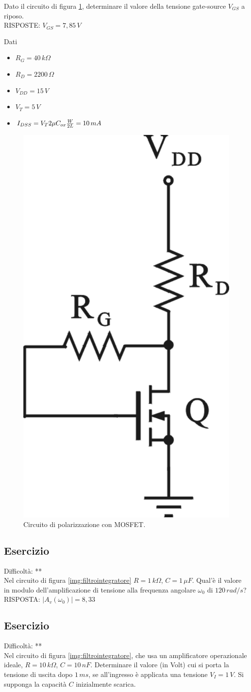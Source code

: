 \documentclass[a4paper,portrait,12pt]{article}
\theoremstyle{definition}
\begin{document}
Dato il circuito di figura \ref{img:MOS2}, determinare il valore della tensione gate-source 
$V_{GS}$ a riposo.\\

RISPOSTE: $V_{GS} = 7,85\,V$

Dati
\begin{itemize}
\item $R_G=40\,k\Omega$ 
\item $R_D=2200\,\Omega$
\item $V_{DD}=15\,V$ 
\item $V_T=5\,V$
\item $I_{DSS}=V_T2\mu C_{ox}{W\over 2L}=10\,mA$
\end{itemize}

\begin{figure}[H]
\centering
\includegraphics[width=.2\linewidth]{img/elettronicaEs/MOS2.pdf}
\caption{Circuito di polarizzazione con MOSFET.}
\label{img:MOS2}
\end{figure}


\subsection{Esercizio}

Difficoltà: **\\

Nel circuito di figura \ref{img:filtrointegratore} $R = 1\,k\Omega$, $C=1\,\mu F$. Qual'è il valore in modulo 
dell'amplificazione di tensione alla frequenza angolare $\omega_0$ di $120\,rad/s$?\\

RISPOSTA: $\left|A_v(\omega_0)\right| = 8,33$


\subsection{Esercizio}

Difficoltà: **\\

Nel circuito di figura \ref{img:filtrointegratore}, che usa un amplificatore operazionale ideale, $R = 10\, 
k\Omega$, $C = 10\,nF$. Determinare il valore (in Volt) cui si porta la tensione di uscita dopo $1\,ms$, se 
all'ingresso è applicata una tensione $V_I = 1\,V$. Si supponga la capacità $C$ inizialmente scarica.\\
\end{document}
